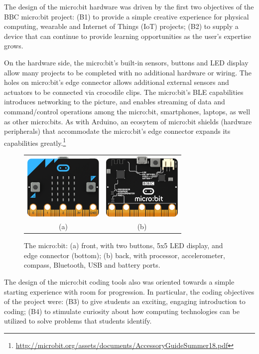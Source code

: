 The design of the micro:bit hardware was driven by the
first two objectives of the BBC micro:bit project:
(B1) to provide a simple creative experience for physical computing, wearable and Internet of Things (IoT) projects;
(B2) to supply a device that can continue to provide learning opportunities as the user's expertise grows.

On the hardware side, the micro:bit's built-in sensors, buttons and LED display 
allow many projects to be completed with no additional hardware or wiring. 
The holes on micro:bit's edge
connector allows additional external sensors and actuators to be connected via crocodile clips.
The micro:bit's BLE capabilities introduces networking to the
picture, and enables streaming of data and command/control operations among the micro:bit, 
smartphones, laptops, as well as other micro:bits.
As with Arduino, an ecosytem of micro:bit shields
(hardware peripherals) that accommodate the micro:bit's edge
connector expands its capabilities greatly.\footnote{
\url{http://microbit.org/assets/documents/AccessoryGuideSummer18.pdf}
}

\begin{figure} 
\begin{tabular}{cc}
  \includegraphics[width=1.5in]{images/microbit-front.png} &
  \includegraphics[width=1.5in]{images/microbit-back.png} \\
  (a) & (b) 
\end{tabular}
\caption{\label{fig:microbit}The micro:bit: (a) front, with two buttons, 
  5x5 LED display, and edge connector (bottom); (b) back, with processor, accelerometer, compass, Bluetooth, USB and battery ports.}
\end{figure}


The design of the micro:bit coding tools also was oriented towards a 
simple starting experience with room for progression. In particular, the coding 
objectives of the project were: (B3)
to give students an exciting, engaging introduction to coding;
(B4) to stimulate curiosity about how computing technologies can be utilized 
  to solve problems that students identify. 

